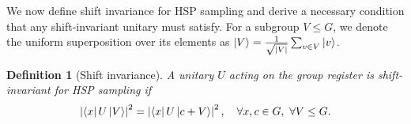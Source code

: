 \documentclass[reprint, aps, prl, superscriptaddress]{revtex4-2}
\newtheorem{definition}{Definition}
\begin{document}


We now define shift invariance for HSP sampling and derive a necessary condition that any shift-invariant unitary must satisfy. For a subgroup $V \le G$, we denote the uniform superposition over its elements as $\ket{V} = \frac{1}{\sqrt{|V|}} \sum_{v \in V} \ket{v}$.

\begin{definition}[Shift invariance]
    A unitary $U$ acting on the group register is shift-invariant for HSP sampling if
    \begin{equation}
    \label{eq:shift invariant def}
        \left|\bra{x}U\ket{V}\right|^2
        =
        \left|\bra{x}U \ket{c+V}\right|^2,
        \quad
        \forall x,c \in G,\ \forall V \le G.
    \end{equation}
\end{definition}

\end{document}
